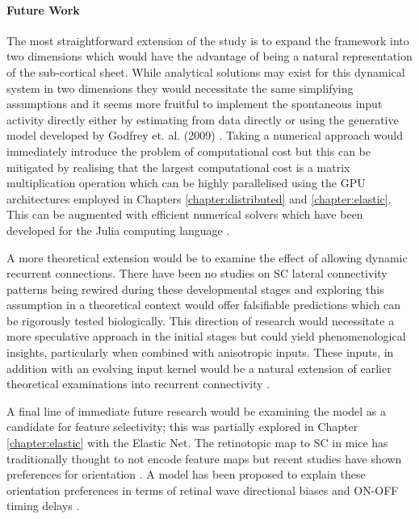 \paragraph{Future Work} The most straightforward extension of the study is to expand the framework into two dimensions which would have the advantage of being a natural representation of the sub-cortical sheet. While analytical solutions may exist for this dynamical system in two dimensions they would necessitate the same simplifying assumptions and it seems more fruitful to implement the spontaneous input activity directly either by estimating from data directly or using the generative model developed by Godfrey et. al. (2009) \cite{Ackman2012-uu, Stafford2009, Godfrey2009-rs, Eglen2014-fo}. Taking a numerical approach would immediately introduce the problem of computational cost but this can be mitigated by realising that the largest computational cost is a matrix multiplication operation which can be highly parallelised using the GPU architectures employed in Chapters \ref{chapter:distributed} and \ref{chapter:elastic}. This can be augmented with efficient numerical solvers which have been developed for the Julia computing language \cite{Sequeira2022}.

A more theoretical extension would be to examine the effect of allowing dynamic recurrent connections. There have been no studies on SC lateral connectivity patterns being rewired during these developmental stages and exploring this assumption in a theoretical context would offer falsifiable predictions which can be rigorously tested biologically. This direction of research would necessitate a more speculative approach in the initial stages but could yield phenomenological insights, particularly when combined with anisotropic inputs. These inputs, in addition with an evolving input kernel would be a natural extension of earlier theoretical examinations into recurrent connectivity \cite{Sirosh1994-zv}.

A final line of immediate future research would be examining the model as a candidate for feature selectivity; this was partially explored in Chapter \ref{chapter:elastic} with the Elastic Net. The retinotopic map to SC in mice has traditionally thought to not encode feature maps but recent studies have shown preferences for orientation \cite{Ahmadlou2015-jw}. A model has been proposed to explain these orientation preferences in terms of retinal wave directional biases and ON-OFF timing delays \cite{Teh2022-tp}. 

